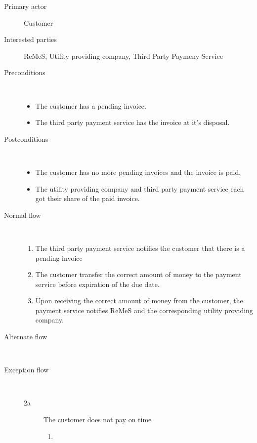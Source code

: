 \begin{description}
	\item[Primary actor] Customer
	\item[Interested parties] ReMeS, Utility providing company, Third Party Paymeny
	Service
	\item[Preconditions] \ 
	\begin{itemize}
		\item The customer has a pending invoice.
		\item The third party payment service has the invoice at it's disposal.
	\end{itemize}
	\item[Postconditions] \ 
	\begin{itemize}
		\item The customer has no more pending invoices and the invoice is paid.
		\item The utility providing company and third party payment service each got
		their share of the paid invoice.
	\end{itemize}
	\item[Normal flow] \ 
	\begin{enumerate}
	  	\item The third party payment service notifies the customer that there is a
	  	pending invoice
	  	\item The customer transfer the correct amount of money to the payment
	  	service before expiration of the due date.
	  	\item Upon receiving the correct amount of money from the customer, the
	  	payment service notifies ReMeS and the corresponding utility providing
	  	company.
	\end{enumerate}
	\item[Alternate flow] \ 
	\item[Exception flow] \ 
	\begin{description}
		\item[2a] The customer does not pay on time
		\begin{enumerate}
		  \item %
		\end{enumerate}
	\end{description}
\end{description}